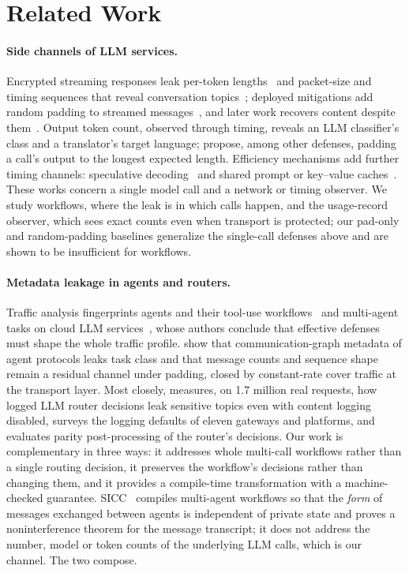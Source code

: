 \section{Related Work}\label{sec:related}

\paragraph{Side channels of LLM services.} Encrypted streaming responses leak per-token lengths~\cite{weiss2024keylog} and packet-size and timing sequences that reveal conversation topics~\cite{mcdonald2025whisper}; deployed mitigations add random padding to streamed messages~\cite{cloudflare2024padding,openai2026obfuscation}, and later work recovers content despite them~\cite{zhang2025netecho,li2026merged}. Output token count, observed through timing, reveals an LLM classifier's class and a translator's target language; \citet{zhang2024timewilltell} propose, among other defenses, padding a call's output to the longest expected length. Efficiency mechanisms add further timing channels: speculative decoding~\cite{wei2024speculation,carlini2024timing} and shared prompt or key--value caches~\cite{gu2025caching,wu2025kvcache}. These works concern a single model call and a network or timing observer. We study workflows, where the leak is in which calls happen, and the usage-record observer, which sees exact counts even when transport is protected; our pad-only and random-padding baselines generalize the single-call defenses above and are shown to be insufficient for workflows.

\paragraph{Metadata leakage in agents and routers.} Traffic analysis fingerprints agents and their tool-use workflows~\cite{zhang2025agentprint} and multi-agent tasks on cloud LLM services~\cite{pouryousef2026benchmark}, whose authors conclude that effective defenses must shape the whole traffic profile. \citet{dangol2026graph} show that communication-graph metadata of agent protocols leaks task class and that message counts and sequence shape remain a residual channel under padding, closed by constant-rate cover traffic at the transport layer. Most closely, \citet{chen2026routing} measures, on 1.7 million real requests, how logged LLM router decisions leak sensitive topics even with content logging disabled, surveys the logging defaults of eleven gateways and platforms, and evaluates parity post-processing of the router's decisions. Our work is complementary in three ways: it addresses whole multi-call workflows rather than a single routing decision, it preserves the workflow's decisions rather than changing them, and it provides a compile-time transformation with a machine-checked guarantee. SICC~\cite{xu2026sicc} compiles multi-agent workflows so that the \emph{form} of messages exchanged between agents is independent of private state and proves a noninterference theorem for the message transcript; it does not address the number, model or token counts of the underlying LLM calls, which is our channel. The two compose.

